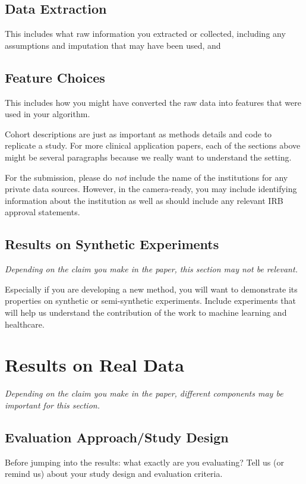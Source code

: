 \documentclass[pmlr]{jmlr}%
\begin{document}
\subsection{Data Extraction} 
This includes what raw information you extracted or collected, including any
assumptions and imputation that may have been used, and 

\subsection{Feature Choices} 
This includes how you might have converted the raw data into features that were
used in your algorithm. 

Cohort descriptions are just as important as methods details and code
to replicate a study.  For more clinical application papers, each of
the sections above might be several paragraphs because we really want
to understand the setting.

For the submission, please do \emph{not} include the name of the
institutions for any private data sources.  However, in the
camera-ready, you may include identifying information about the
institution as well as should include any relevant IRB approval
statements.

\subsection{Results on Synthetic Experiments}

\emph{Depending on the claim you make in the paper, this section may
  not be relevant.}

Especially if you are developing a new method, you will want to
demonstrate its properties on synthetic or semi-synthetic experiments.
Include experiments that will help us understand the contribution of
the work to machine learning and healthcare. 

\section{Results on Real Data} 

\emph{Depending on the claim you make in the paper, different
  components may be important for this section.}

\subsection{Evaluation Approach/Study Design} 
Before jumping into the results: what exactly are you evaluating?
Tell us (or remind us) about your study design and evaluation
criteria.
\end{document}
